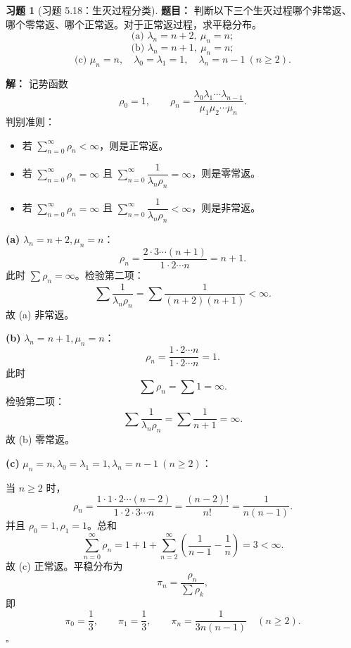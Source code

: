 \documentclass[12pt,a4paper,openany]{ctexrep}
\theoremstyle{definition}
\newtheorem{exercise}{习题}[section]
\newenvironment{solution}{\par\noindent\textbf{解：}}{\hfill$\square$\par}
\begin{document}
\begin{exercise}[习题 5.18：生灭过程分类]
\textbf{题目：}
判断以下三个生灭过程哪个非常返、哪个零常返、哪个正常返。对于正常返过程，求平稳分布。
\[
\text{(a) }\lambda_n=n+2,\ \mu_n=n;
\]
\[
\text{(b) }\lambda_n=n+1,\ \mu_n=n;
\]
\[
\text{(c) }\mu_n=n,\quad \lambda_0=\lambda_1=1,\quad \lambda_n=n-1\ (n\ge2).
\]
\end{exercise}
\begin{solution}
记势函数
\[
\rho_0=1,\qquad
\rho_n=\frac{\lambda_0\lambda_1\cdots\lambda_{n-1}}
{\mu_1\mu_2\cdots\mu_n}.
\]
判别准则：
\begin{itemize}
	\item 若 $\sum_{n=0}^{\infty}\rho_n<\infty$，则是正常返。
	\item 若 $\sum_{n=0}^{\infty}\rho_n=\infty$ 且 $\sum_{n=0}^{\infty}\dfrac1{\lambda_n\rho_n}=\infty$，则是零常返。
	\item 若 $\sum_{n=0}^{\infty}\rho_n=\infty$ 且 $\sum_{n=0}^{\infty}\dfrac1{\lambda_n\rho_n}<\infty$，则是非常返。
\end{itemize}

\textbf{(a)} $\lambda_n=n+2,\mu_n=n$：
\[
\rho_n=\frac{2\cdot3\cdots(n+1)}{1\cdot2\cdots n}=n+1.
\]
此时 $\sum\rho_n=\infty$。检验第二项：
\[
\sum\frac1{\lambda_n\rho_n}
=\sum\frac1{(n+2)(n+1)}<\infty.
\]
故 (a) 非常返。

\textbf{(b)} $\lambda_n=n+1,\mu_n=n$：
\[
\rho_n=\frac{1\cdot2\cdots n}{1\cdot2\cdots n}=1.
\]
此时
\[
\sum\rho_n=\sum1=\infty.
\]
检验第二项：
\[
\sum\frac1{\lambda_n\rho_n}
=\sum\frac1{n+1}=\infty.
\]
故 (b) 零常返。

\textbf{(c)} $\mu_n=n,\lambda_0=\lambda_1=1,\lambda_n=n-1\ (n\ge2)$：

当 $n\ge2$ 时，
\[
\rho_n=\frac{1\cdot1\cdot2\cdots(n-2)}{1\cdot2\cdot3\cdots n}
=\frac{(n-2)!}{n!}
=\frac1{n(n-1)}.
\]
并且 $\rho_0=1,\rho_1=1$。总和
\[
\sum_{n=0}^{\infty}\rho_n
=1+1+\sum_{n=2}^{\infty}\left(\frac1{n-1}-\frac1n\right)
=3<\infty.
\]
故 (c) 正常返。平稳分布为
\[
\pi_n=\frac{\rho_n}{\sum\rho_k},
\]
即
\[
\pi_0=\frac13,\qquad
\pi_1=\frac13,\qquad
\pi_n=\frac1{3n(n-1)}\quad(n\ge2).
\]
\end{solution}
\end{document}
